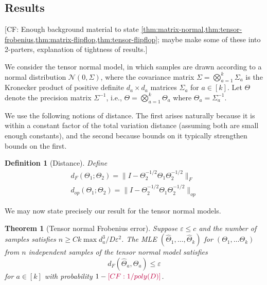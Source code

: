 \documentclass{article}
\newtheorem{theorem}{Theorem}
\newtheorem{definition}{Definition}
\newcommand\eps{\varepsilon}
\newcommand\cN{\mathcal{N}}
\newcommand{\CF}[1]{{\color{purple}[CF: #1]}}
\begin{document}
\subsection{Results}

\CF{Enough background material to state \cref{thm:matrix-normal,thm:tensor-frobenius,thm:matrix-flipflop,thm:tensor-flipflop}; maybe make some of these into 2-parters, explanation of tightness of results.}

We consider the tensor normal model, in which samples are drawn according to a normal distribution $\cN(0, \Sigma)$, where the covariance matrix $\Sigma = \bigotimes_{a = 1}^{k} \Sigma_a$ is the Kronecker product of positive definite $d_a\times d_a$ matrices $\Sigma_a$ for $a\in [k]$.
Let $\Theta$ denote the precision matrix $\Sigma^{-1}$, i.e., $\Theta = \bigotimes_{a=1}^k \Theta_a$ where $\Theta_a = \Sigma_a^{-1}$.

We use the following notions of distance. The first arises naturally because it is within a constant factor of the total variation distance (assuming both are small enough constants), and the second because bounds on it typically strengthen bounds on the first.

\begin{definition}[Distance]
Define
\begin{align}d_{F}(\Theta_1; \Theta_2) = \| I - \Theta_2^{-1/2} \Theta_1 \Theta_2^{-1/2}\|_F\\
d_{op}(\Theta_1; \Theta_2) = \| I - \Theta_2^{-1/2} \Theta_1 \Theta_2^{-1/2}\|_{op}
\end{align}
\end{definition}

We may now state precisely our result for the tensor normal models.

\begin{theorem}[Tensor normal Frobenius error]\label{thm:tensor-frobenius} Suppose $\eps \leq c$ and the number of samples satisfies $n \geq C k \max d_{a}^3/D\eps^2$. The MLE $(\widehat{\Theta}_1, \dots, \widehat{\Theta}_k) $ for $(\Theta_1, \dots \Theta_k)$ from $n$ independent samples of the tensor normal model satisfies
$$ d_{F}(\widehat{\Theta}_a, \Theta_a) \leq \eps $$
for $a \in [k]$ with probability $1 - \CF{1/poly(D)}$.
\end{theorem}
\end{document}
